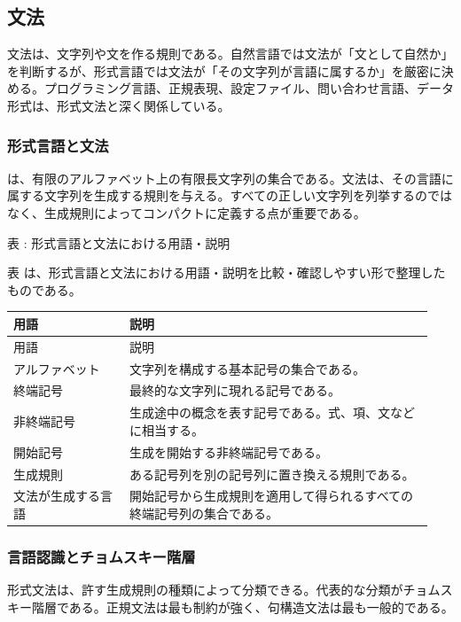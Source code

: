 \subsection{文法}
文法は、文字列や文を作る規則である。自然言語では文法が「文として自然か」を判断するが、形式言語では文法が「その文字列が言語に属するか」を厳密に決める。プログラミング言語、正規表現、設定ファイル、問い合わせ言語、データ形式は、形式文法と深く関係している。

\subsubsection{形式言語と文法}
は、有限のアルファベット上の有限長文字列の集合である。文法は、その言語に属する文字列を生成する規則を与える。すべての正しい文字列を列挙するのではなく、生成規則によってコンパクトに定義する点が重要である。

\par\smallskip\noindent{}\label{tab:ch17-14}表 \thetable: 形式言語と文法における用語・説明\par\smallskip
表 \thetable は、形式言語と文法における用語・説明を比較・確認しやすい形で整理したものである。\par\smallskip
\begin{longtable}{>{\raggedright\arraybackslash}p{0.26\linewidth} >{\raggedright\arraybackslash}p{0.68\linewidth}}
\toprule
用語 & 説明 \\
\midrule
\endfirsthead
\toprule
用語 & 説明 \\
\midrule
\endhead
アルファベット & 文字列を構成する基本記号の集合である。 \\
終端記号 & 最終的な文字列に現れる記号である。 \\
非終端記号 & 生成途中の概念を表す記号である。式、項、文などに相当する。 \\
開始記号 & 生成を開始する非終端記号である。 \\
生成規則 & ある記号列を別の記号列に置き換える規則である。 \\
文法が生成する言語 & 開始記号から生成規則を適用して得られるすべての終端記号列の集合である。 \\
\bottomrule
\end{longtable}
\subsubsection{言語認識とチョムスキー階層}
形式文法は、許す生成規則の種類によって分類できる。代表的な分類がチョムスキー階層である。正規文法は最も制約が強く、句構造文法は最も一般的である。

